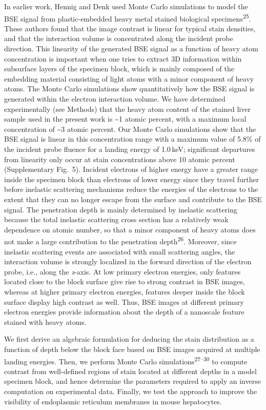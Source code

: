 \documentclass{article}
\newcommand{\cit}[1]{\textsuperscript{#1}}
\begin{document}
In earlier work, Hennig and Denk used Monte Carlo simulations to model the BSE signal from plastic-embedded heavy metal stained biological specimens\cit{25}. These authors found that the image contrast is linear for typical stain densities, and that the interaction volume is concentrated along the incident probe direction. This linearity of the generated BSE signal as a function of heavy atom concentration is important when one tries to extract 3D information within subsurface layers of the specimen block, which is mainly composed of the embedding material consisting of light atoms with a minor component of heavy atoms. The Monte Carlo simulations show quantitatively how the BSE signal is generated within the electron interaction volume. We have determined experimentally (see Methods) that the heavy atom content of the stained liver sample used in the present work is \textasciitilde1 atomic percent, with a maximum local concentration of \textasciitilde3 atomic percent. Our Monte Carlo simulations show that the BSE signal is linear in this concentration range with a maximum value of 5.8\% of the incident probe fluence for a landing energy of 1.0\,keV; significant departures from linearity only occur at stain concentrations above 10 atomic percent (Supplementary Fig.~5). Incident electrons of higher energy have a greater range inside the specimen block than electrons of lower energy since they travel further before inelastic scattering mechanisms reduce the energies of the electrons to the extent that they can no longer escape from the surface and contribute to the BSE signal. The penetration depth is mainly determined by inelastic scattering because the total inelastic scattering cross section has a relatively weak dependence on atomic number, so that a minor component of heavy atoms does not make a large contribution to the penetration depth\cit{26}. Moreover, since inelastic scattering events are associated with small scattering angles, the interaction volume is strongly localized in the forward direction of the electron probe, i.e., along the \emph{z}-axis. At low primary electron energies, only features located close to the block surface give rise to strong contrast in BSE images, whereas at higher primary electron energies, features deeper inside the block surface display high contrast as well. Thus, BSE images at different primary electron energies provide information about the depth of a nanoscale feature stained with heavy atoms.

We first derive an algebraic formulation for deducing the stain distribution as a function of depth below the block face based on BSE images acquired at multiple landing energies. Then, we perform Monte Carlo simulations\cit{27–30} to compute contrast from well-defined regions of stain located at different depths in a model specimen block, and hence determine the parameters required to apply an inverse computation on experimental data. Finally, we test the approach to improve the visibility of endoplasmic reticulum membranes in mouse hepatocytes.
\end{document}
